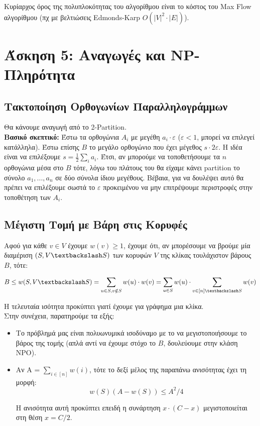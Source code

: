 	Κυρίαρχος όρος της πολυπλοκότητας του αλγορίθμου είναι το κόστος του Max Flow αλγορίθμου (πχ με βελτιώσεις Edmonds-Karp $O(|V|^2\cdot|E|)$).


\section*{Άσκηση 5: Αναγωγές και NP-Πληρότητα}
	\subsection*{Τακτοποίηση Ορθογωνίων Παραλληλογράμμων}
		Θα κάνουμε αναγωγή από το 2-Partition. \\
		
		\textbf{Βασικό σκεπτικό:} Έστω τα ορθογώνια $A_i$ με μεγέθη $a_i \cdot ε$ ($ε < 1$, μπορεί να επιλεγεί κατάλληλα). Έστω επίσης $B$ το μεγάλο ορθογώνιο που έχει μέγεθος $s \cdot 2ε $. Η ιδέα είναι να επιλέξουμε $s = \frac{1}{2}\sum_{i}a_i$. Έτσι, αν μπορούμε να τοποθετήσουμε τα $n$ ορθογώνια μέσα στο $B$ τότε, λόγω του πλάτους του θα είχαμε κάνει partition το σύνολο ${a_1, ..., a_n}$ σε δύο σύνολα ίδιου μεγέθους. Βέβαια, για να δουλέψει αυτό θα πρέπει να επιλέξουμε σωστά το $ε$ προκειμένου να μην επιτρέψουμε περιστροφές στην τοποθέτηση των $A_i$. 
			
	\subsection*{Μέγιστη Τομή με Βάρη στις Κορυφές}
	
		Αφού για κάθε $v \in V$ έχουμε $w(v) \geq 1$, έχουμε ότι, αν μπορέσουμε να βρούμε μία διαμέριση $(S, V \textbackslash S)$ των κορυφών $V$ της κλίκας τουλάχιστον βάρους $B$, τότε: 
		
		\[
			B \leq w(S, V \textbackslash S) = \sum_{u \in S, v \notin S} w(u) \cdot w(v) = \sum_{u \in S} w(u) \cdot \sum_{v \in [n] \textbackslash S} w(v) 
		\]
		
		Η τελευταία ισότητα προκύπτει γιατί έχουμε για γράφημα μια κλίκα. \\
		Στην συνέχεια, παρατηρούμε τα εξής: 
		
		\begin{itemize}
			\item Το πρόβλημά μας είναι πολυωνυμικά ισοδύναμο με το να μεγιστοποιήσουμε το βάρος της τομής (απλά αντί να έχουμε στόχο το $B$, δουλεύουμε στην κλάση NPO).
			\item Αν A = $\sum_{i \in [n]}w(i)$, τότε το δεξί μέλος της παραπάνω ανισότητας έχει τη μορφή:
				\[
					w(S)(A-w(S)) \leq A^2/4
				\]
				
				Η ανισότητα αυτή προκύπτει επειδή η συνάρτηση $x\cdot(C-x)$ μεγιστοποιείται στη θέση ${x = C/2}$.
		\end{itemize}
	
